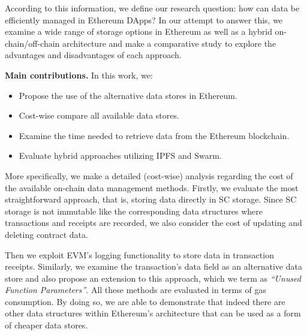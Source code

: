 According to this information, we define our research question: how can data be efficiently managed in Ethereum DApps?
In our attempt to answer this, we examine a wide range of storage options in Ethereum as well as a hybrid on-chain/off-chain architecture and make a comparative study to explore the advantages and disadvantages of each approach. 

{\bf Main contributions.} In this work, we:
\begin{itemize}[topsep=0pt, itemsep=0pt]
\item{Propose the use of the alternative data stores in Ethereum.}
\item{Cost-wise compare all available data stores.}
\item{Examine the time needed to retrieve data from the Ethereum blockchain.}
\item{Evaluate hybrid approaches utilizing IPFS and Swarm.}
\end{itemize}

More specifically, we make a detailed (cost-wise) analysis regarding the cost of the available on-chain data management methods. Firstly, we evaluate the most straightforward approach, that is, storing data directly in SC storage. Since SC storage is not immutable like the corresponding data structures where transactions and receipts are recorded, we also consider the cost of updating and deleting contract data. 

Then we exploit EVM’s logging functionality to store data in transaction receipts. Similarly, we examine the transaction's data field as an alternative data store and also propose an extension to this approach, which we term as \emph{``Unused Function Parameters''}. All these methods are evaluated in terms of gas consumption. By doing so, we are able to demonstrate that indeed there are other data structures within Ethereum’s architecture that can be used as a form of cheaper data stores.


